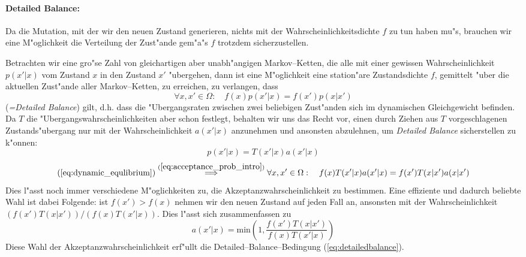 		
	\paragraph{Detailed Balance:}
	Da die Mutation, mit der wir den neuen Zustand generieren, nichts mit der Wahrscheinlichkeitsdichte $f$ zu tun haben mu"s, brauchen wir eine M"oglichkeit die Verteilung der Zust"ande gem"a"s $f$ trotzdem sicherzustellen.
	
	Betrachten wir eine gro"se Zahl von gleichartigen aber unabh"angigen Markov--Ketten, die alle mit einer gewissen Wahrscheinlichkeit $p(x'|x)$ vom Zustand $x$ in den Zustand $x'$ "ubergehen, dann ist eine M"oglichkeit eine station"are Zustandsdichte $f$, gemittelt "uber die aktuellen Zust"ande aller Markov--Ketten, zu erreichen, zu verlangen, dass
	\begin{equation}
		\forall x,x' \in \Omega :\quad f(x)p(x'|x) = f(x')p(x|x')
		\label{eq:dynamic_equlibrium}
	\end{equation}
	({\em =Detailed Balance}) gilt, d.h. dass die "Ubergangsraten zwischen zwei beliebigen Zust"anden sich im dynamischen Gleichgewicht befinden.
	Da $T$ die "Ubergangswahrscheinlichkeiten aber schon festlegt, behalten wir uns das Recht vor, einen durch Ziehen aus $T$ vorgeschlagenen Zustands"ubergang nur mit der Wahrscheinlichkeit $a(x'|x)$ anzunehmen und ansonsten abzulehnen,	um {\em Detailed Balance} sicherstellen zu k"onnen:
	\begin{equation}
		p(x'|x) = T(x'|x)a(x'|x)
		\label{eq:acceptance_prob_intro}
	\end{equation}
	\begin{equation}
		(\ref{eq:dynamic_equlibrium}) \stackrel{(\ref{eq:acceptance_prob_intro})}{\Longrightarrow}
		\forall x,x' \in \Omega :\quad f(x)T(x'|x)a(x'|x) = f(x')T(x|x')a(x|x')
		\label{eq:detailedbalance}
	\end{equation}
	Dies l"asst noch immer verschiedene M"oglichkeiten zu, die Akzeptanzwahrscheinlichkeit zu bestimmen. Eine effiziente und dadurch beliebte Wahl ist dabei Folgende: ist $f(x')>f(x)$ nehmen wir den neuen Zustand auf jeden Fall an, ansonsten mit der Wahrscheinlichkeit $(f(x')T(x|x'))/(f(x)T(x'|x))$. Dies l"asst sich zusammenfassen zu
	\begin{equation}
		a(x'|x)=\text{min}\left(1,\frac{f(x')T(x|x')}{f(x)T(x'|x)}\right)
		\label{eq:acceptanceratio}
	\end{equation}
	Diese Wahl der Akzeptanzwahrscheinlichkeit erf"ullt die Detailed--Balance--Bedingung (\ref{eq:detailedbalance}).
	
